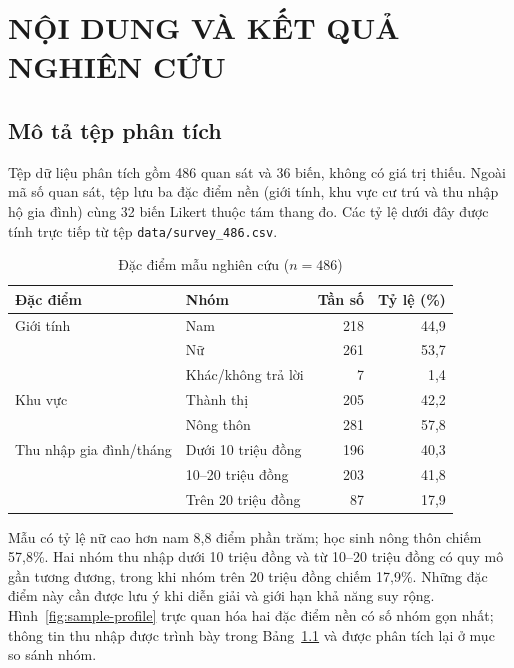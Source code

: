 \chapter{NỘI DUNG VÀ KẾT QUẢ NGHIÊN CỨU}

\section{Mô tả tệp phân tích}
Tệp dữ liệu phân tích gồm 486 quan sát và 36 biến, không có giá trị thiếu. Ngoài mã số quan sát, tệp lưu ba đặc điểm nền (giới tính, khu vực cư trú và thu nhập hộ gia đình) cùng 32 biến Likert thuộc tám thang đo. Các tỷ lệ dưới đây được tính trực tiếp từ tệp \texttt{data/survey\_486.csv}.

\begin{table}[H]\centering\caption{Đặc điểm mẫu nghiên cứu ($n=486$)}\label{tab:sample}
\begin{tabularx}{\textwidth}{p{3.5cm}X r r}\toprule Đặc điểm & Nhóm & Tần số & Tỷ lệ (\%)\\\midrule
Giới tính & Nam & 218 & 44,9\\ & Nữ & 261 & 53,7\\ & Khác/không trả lời & 7 & 1,4\\
Khu vực & Thành thị & 205 & 42,2\\ & Nông thôn & 281 & 57,8\\
Thu nhập gia đình/tháng & Dưới 10 triệu đồng & 196 & 40,3\\ & 10--20 triệu đồng & 203 & 41,8\\ & Trên 20 triệu đồng & 87 & 17,9\\\bottomrule
\end{tabularx}\end{table}

Mẫu có tỷ lệ nữ cao hơn nam 8,8 điểm phần trăm; học sinh nông thôn chiếm 57,8\%. Hai nhóm thu nhập dưới 10 triệu đồng và từ 10--20 triệu đồng có quy mô gần tương đương, trong khi nhóm trên 20 triệu đồng chiếm 17,9\%. Những đặc điểm này cần được lưu ý khi diễn giải và giới hạn khả năng suy rộng.
Hình~\ref{fig:sample-profile} trực quan hóa hai đặc điểm nền có số nhóm gọn nhất; thông tin thu nhập được trình bày trong Bảng~\ref{tab:sample} và được phân tích lại ở mục so sánh nhóm.
\figSampleProfile

